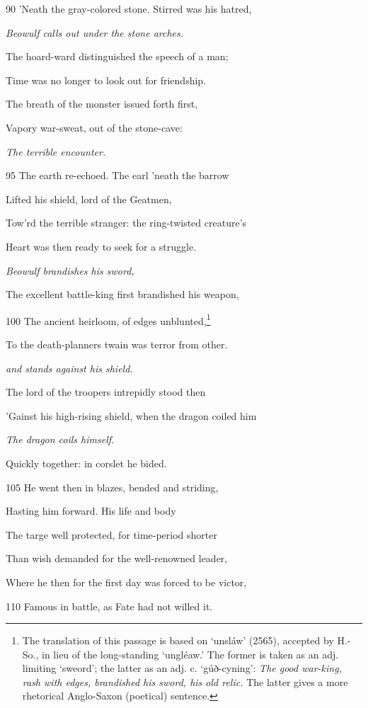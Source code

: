 90
’Neath the gray-colored stone. Stirred was his hatred,

\emph{Beowulf calls out
under the stone
arches.}

The hoard-ward distinguished the speech of a man;

Time was no longer to look out for friendship.

The breath of the monster issued forth first,

Vapory war-sweat, out of the stone-cave:

\emph{The terrible encounter.}

95
The earth re-echoed. The earl ’neath the barrow

Lifted his shield, lord of the Geatmen,

Tow’rd the terrible stranger: the ring-twisted creature’s

Heart was then ready to seek for a struggle.

\emph{Beowulf brandishes
his sword,}

The excellent battle-king first brandished his weapon,

100
The ancient heirloom, of edges unblunted,\footnote{The translation of this passage is based on ‘unsláw’ (2565), accepted by
H.-So., in lieu of the long-standing ‘ungléaw.’ The former is taken as an
adj. limiting ‘sweord’; the latter as an adj. c. ‘gúð-cyning’: \emph{The good war-king,
rash with edges, brandished his sword, his old relic.} The latter gives a
more rhetorical Anglo-Saxon (poetical) sentence.}

To the death-planners twain was terror from other.

\emph{and stands against
his shield.}

The lord of the troopers intrepidly stood then

’Gainst his high-rising shield, when the dragon coiled him

\emph{The dragon coils
himself.}

Quickly together: in corslet he bided.

105
He went then in blazes, bended and striding,

Hasting him forward. His life and body

The targe well protected, for time-period shorter

Than wish demanded for the well-renowned leader,

Where he then for the first day was forced to be victor,

110
Famous in battle, as Fate had not willed it.

